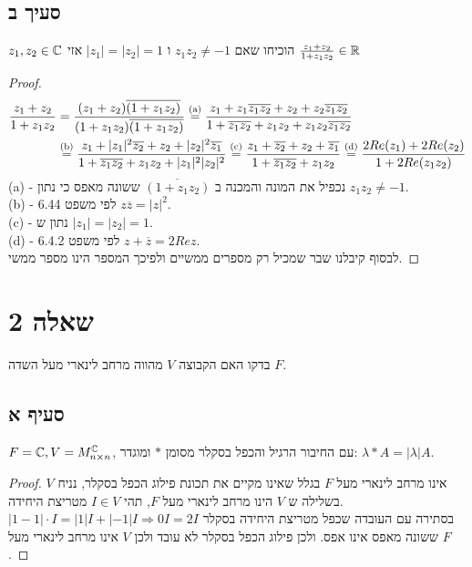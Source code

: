 \documentclass{article}
\begin{document}
	\subsection*{סעיך ב}
	$z_1, z_2 \in \mathbb{C}$ הוכיחו שאם $z_1z_2 \neq -1$ ו $|z_1| = |z_2| = 1$ אזי $\frac{z_1+z_2}{1+z_1z_2} \in \mathbb{R}$
	\begin{proof}
		\begin{align*}
			\frac{z_1+z_2}{1+z_1z_2} &=
			\frac{(z_1+z_2)\overline{(1+z_1z_2)}}{(1+z_1z_2)\overline{(1+z_1z_2)}} \overset{\text{(a)}}=
			\frac{z_1 + z_1\overline{z_1z_2} + z_2 + z_2\overline{z_1z_2}}{1 + \overline{z_1z_2} + z_1z_2 + z_1z_2\overline{z_1z_2}} \\
			&\overset{\text{(b)}}=	\frac{z_1 + |z_1|^2\overline{z_2} + z_2 + |z_2|^2\overline{z_1}}{1 + \overline{z_1z_2} + z_1z_2 + |z_1|^2|z_2|^2} \overset{\text{(c)}}=
			\frac{z_1 + \overline{z_2} + z_2 + \overline{z_1}}{1 + \overline{z_1z_2} + z_1z_2} \overset{\text{(d)}}=
			\frac{2Re(z_1) + 2Re(z_2)}{1 + 2Re(z_1z_2)}
		\end{align*}
		(a) - נכפיל את המונה והמכנה ב $\overline{(1+z_1z_2)}$ ששונה מאפס כי נתון $z_1z_2 \neq -1$. \\
		(b) - לפי משפט 6.44 $z\overline{z} = |z|^2$. \\
		(c) - נתון ש $|z_1| = |z_2| = 1$. \\
		(d) - לפי משפט 6.4.2 $z + \overline{z} = 2Re z$. \\
		לבסוף קיבלנו שבר שמכיל רק מספרים ממשיים ולפיכך המספר הינו מספר ממשי.
	\end{proof}

	\section*{שאלה 2}
	בדקו האם הקבוצה $V$ מהווה מרחב לינארי מעל השדה $F$.
	\subsection*{סעיף א}
	$F = \mathbb{C}, V = M^{\mathbb{C}}_{n \times n}$, עם החיבור הרגיל והכפל בסקלר מסומן $*$ ומוגדר: $\lambda * A = |\lambda|A$.
	\begin{proof}
		$V$ אינו מרחב לינארי מעל $F$ בגלל שאינו מקיים את תכונת פילוג הכפל בסקלר, נניח בשלילה ש $V$ הינו מרחב לינארי מעל $F$, תהי $I \in V$ מטריצת היחידה. \\
		$|1-1| \cdot I = |1|I + |-1|I \Rightarrow 0I = 2I$ בסתירה עם העובדה שכפל מטריצת היחידה בסקלר ששונה מאפס אינו אפס.
		ולכן פילוג הכפל בסקלר לא עובד ולכן $V$ אינו מרחב לינארי מעל $F$.
	\end{proof}
\end{document}
